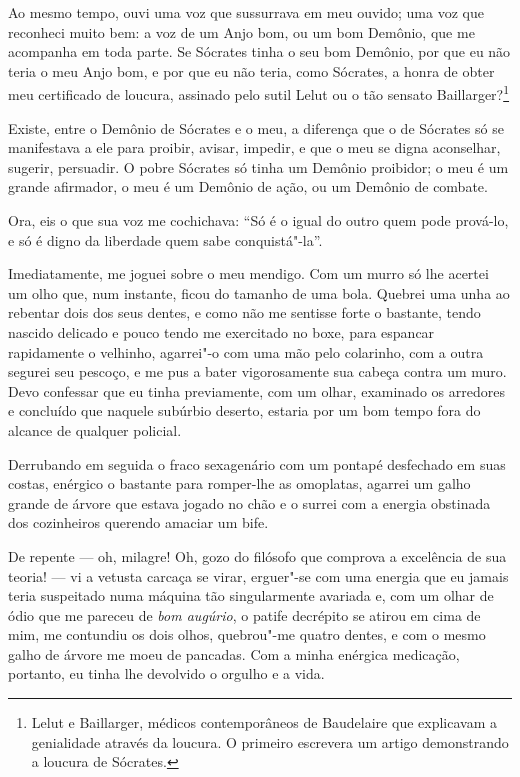 Ao mesmo tempo, ouvi uma voz que sussurrava em meu ouvido; uma voz que
reconheci muito bem: a voz de um Anjo bom, ou um bom Demônio, que me
acompanha em toda parte. Se Sócrates tinha o seu bom Demônio, por que
eu não teria o meu Anjo bom, e por que eu não teria, como
Sócrates, a honra de obter meu certificado de loucura, assinado pelo
sutil Lelut ou o tão sensato Baillarger?\protect\footnote{  Lelut e Baillarger, 
médicos contemporâneos de Baudelaire que explicavam a 
genialidade através da loucura. O primeiro escrevera um
artigo demonstrando a loucura de Sócrates.}

Existe, entre o Demônio de Sócrates e o meu, a diferença que o de Sócrates
só se manifestava a ele para proibir, avisar, impedir, e que o meu se
digna aconselhar, sugerir, persuadir. O pobre Sócrates só tinha um
Demônio proibidor; o meu é um grande afirmador, o meu é um Demônio de
ação, ou um Demônio de combate.

Ora, eis o que sua voz me cochichava: “Só é o igual do
outro quem pode prová-lo, e só é digno da liberdade quem sabe
conquistá"-la''.

Imediatamente, me joguei sobre o meu mendigo. Com um murro só lhe acertei
um olho que, num instante, ficou do tamanho de uma bola. Quebrei
uma unha ao rebentar dois dos seus dentes, e como não me sentisse forte o
bastante, tendo nascido delicado e pouco tendo me exercitado no boxe,
para espancar rapidamente o velhinho, agarrei"-o com uma mão pelo
colarinho, com a outra segurei seu pescoço, e me pus a bater
vigorosamente sua cabeça contra um muro. Devo confessar que eu tinha
previamente, com um olhar, examinado os arredores e concluído que
naquele subúrbio deserto, estaria por um bom tempo fora do
alcance de qualquer policial.

Derrubando em seguida o fraco sexagenário com um pontapé desfechado em suas costas, enérgico o
bastante para romper-lhe as omoplatas, agarrei um galho grande de árvore que estava jogado no
chão e o surrei com a energia obstinada dos cozinheiros querendo
amaciar um bife.

De repente --- oh, milagre! Oh, gozo do filósofo que comprova a
excelência de sua teoria! --- vi a vetusta carcaça se virar,
erguer"-se com uma energia que eu jamais teria suspeitado numa máquina
tão singularmente avariada e, com um olhar de ódio que me pareceu de
\textit{bom augúrio}, o patife decrépito se atirou em cima de mim, me contundiu
os dois olhos, quebrou"-me quatro dentes, e com o mesmo galho de
árvore me moeu de pancadas. Com a minha enérgica medicação, portanto, eu 
tinha lhe devolvido o orgulho e a vida.

